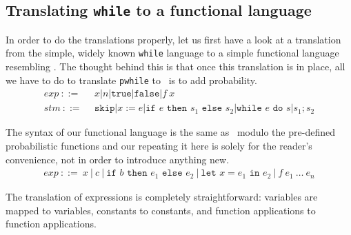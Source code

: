 \documentclass[11pt, leqno, titlepage]{article}
\theoremstyle{definition}
\begin{document}



\subsection{Translating \texttt{while} to a functional
  language}\label{sec:while-to-fun} 
% 
In order to do the translations properly, let us first have a look at a translation
from the simple, widely known \texttt{while} language to a simple functional language
resembling \rml. The thought behind this is that once this translation is in place,
all we have to do to translate \texttt{pwhile} to \rml\ is to add probability.
\begin{align*}
  exp~  ::=~~ & x \vert n \vert \texttt{true} \vert \texttt{false} \vert f~x \\
  stm~  ::=~~ & \texttt{skip} \vert x := e
               \vert \texttt{if } e \texttt{ then } s_1 \texttt{ else } s_2
               \vert \texttt{while } e \texttt{ do } s \vert s_1;s_2
\end{align*}

The syntax of our functional language is the same as \rml\ modulo the pre-defined
probabilistic functions and our repeating it here is solely for the reader's
convenience, not in order to introduce anything new. 
\begin{align*}
  exp~::= ~ x~\vert ~ c~\vert ~ \texttt{if }b\texttt{ then }e_1\texttt{ else } e_2~
  \vert ~ \texttt{let }x = e_1 \texttt{ in }e_2~\vert ~ f~e_1~\dots~e_n
\end{align*}


The translation of expressions is completely straightforward: variables are mapped to
variables, constants to constants, and function applications to function
applications.
\end{document}
